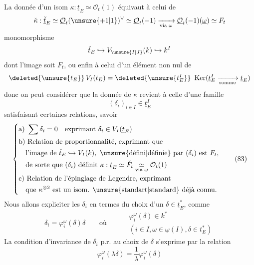La donnée d'un isom $\kappa:\underline t_E\simeq\mathcal O_t(1)$ équivaut à celui de
\[
 \check\kappa:\underline{\check t}_E\simeq\underline{\mathcal O}_t(\unsure{+1|1})^\vee\simeq\underline{\mathcal O}_t(-1)
 \xrightarrow[\text{via }\omega]{}\underline{\mathcal O}_t(-1)(\underline\omega)\simeq F_t
\]
  monomorphisme
\[
 \check t_E\hookrightarrow V_{\unsure{I|J}}(k)\hookrightarrow k^I
\]
dont l'image soit $F_t$, ou enfin à celui d'un élément non nul de
\[
 \deleted{\unsure{t_E}}\,V_I(t_E)=\deleted{\unsure{t_E^I}}\ \operatorname{Ker}(\underline t_E^I\xrightarrow[\text{somme}]{}\underline t_E)
\]
donc on peut considérer que la donnée de $\kappa$ revient à celle d'une famille
\[
 (\delta_i)_{i\in I}\in\underline t_E^I \tag*{(82)}
\]
satisfaisant certaines relations, savoir
\[
 \left\{\begin{aligned}
 &\text{a) }\sum\delta_i=0\quad\text{exprimant }\delta_i\in V_I(\underline t_E)\\
 &\text{b) Relation de proportionnalité, exprimant que}\\
 &\quad\text{l'image de }\check t_E\hookrightarrow V_I(k),\ \text{\unsure{défini|définie} par }(\delta_i)\text{ est }F_t,\\
 &\quad\text{de sorte que }(\delta_i)\text{ définit }\kappa:\underline t_E\simeq\check F_t\underset{\text{via }\omega}{\simeq}\mathcal O_t(1)\\
 &\text{c) Relation de l'épinglage de Legendre, exprimant}\\
 &\quad\text{que }\kappa^{\otimes2}\text{ est un isom. }\text{\unsure{standart|standard}}\text{ déjà connu.}
 \end{aligned}\right. \tag*{(83)}
\]
Nous allons expliciter les $\delta_i$ en termes du choix d'un $\delta\in\underline t_E^*$,  comme
\[
 \delta_i=\varphi_i^\omega(\delta)\delta\qquad\text{où}\qquad
 \begin{aligned}&\varphi_i^\omega(\delta)\in k^*\\ &(i\in I,\omega\in\underline\omega(I),\delta\in t_E^*)\end{aligned} \tag*{(84)}
\]
La condition d'invariance de $\delta_i$ p.r. au choix de $\delta$ s'exprime par la relation
\[
 \varphi_i^\omega(\lambda\delta)=\frac1\lambda\varphi_i^\omega(\delta) \tag*{(85)}
\]
